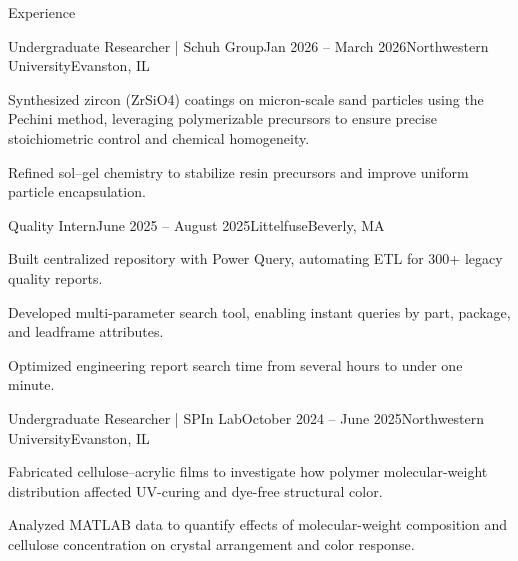 \documentclass[
    a4paper,
    9pt,
]{resume}
\begin{document}
\begin{rSection}{Experience}
\begin{rSubsection}{Undergraduate Researcher | Schuh Group}{Jan 2026 -- March 2026}{Northwestern University}{Evanston, IL}
    \item Synthesized zircon (ZrSiO4) coatings on micron-scale sand particles using the Pechini method, leveraging polymerizable precursors to ensure precise stoichiometric control and chemical homogeneity.
    \item Refined sol–gel chemistry to stabilize resin precursors and improve uniform particle encapsulation.
\end{rSubsection}

\begin{rSubsection}{Quality Intern}{June 2025 -- August 2025}{Littelfuse}{Beverly, MA}
    \item Built centralized repository with Power Query, automating ETL for 300+ legacy quality reports.
    \item Developed multi-parameter search tool, enabling instant queries by part, package, and leadframe attributes.
    \item Optimized engineering report search time from several hours to under one minute.
\end{rSubsection}

\begin{rSubsection}{Undergraduate Researcher | SPIn Lab}{October 2024 -- June 2025}{Northwestern University}{Evanston, IL}
    \item Fabricated cellulose–acrylic films to investigate how polymer molecular-weight distribution affected UV-curing and dye-free structural color.
    \item Analyzed MATLAB data to quantify effects of molecular-weight composition and cellulose concentration on crystal arrangement and color response.

\end{rSubsection}



\end{rSection}
\end{document}
